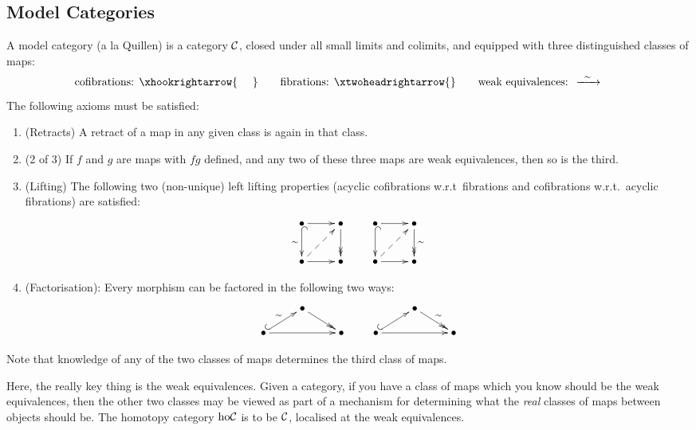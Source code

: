 \documentclass[11pt]{article}
\begin{document}
\subsection*{Model Categories}
A model category (a la Quillen) is a category $\mathcal{C}$, closed under all small limits and colimits, and equipped with three distinguished classes of maps:
\[\text{cofibrations: }\xhookrightarrow{\ \ \ \ }\qquad\text{fibrations: }\xtwoheadrightarrow{}\qquad\text{weak equivalences: }\xrightarrow{\ \,\sim\,\ }\qquad\]
The following axioms must be satisfied:
\begin{enumerate}\squishlist
\item (Retracts) A retract of a map in any given class is again in that class.
\item (2 of 3) If $f$ and $g$ are maps with $fg$ defined, and any two of these  three maps are weak equivalences, then so is the third.
\item (Lifting) The following two (non-unique) left lifting properties (acyclic cofibrations w.r.t\ fibrations and cofibrations w.r.t.\ acyclic fibrations) are satisfied:
\[\xymatrix{
\Bullet\ar[r]\ar@{^{(}->}[d]_\sim&\Bullet\ar@{->>}[d]\\
\Bullet\ar[r]\ar@{-->}[ur]&\Bullet
}\qquad
\xymatrix{
\Bullet\ar[r]\ar@{^{(}->}[d]&\Bullet\ar@{->>}[d]^\sim\\
\Bullet\ar[r]\ar@{-->}[ur]&\Bullet
}\]
\item (Factorisation): Every morphism can be factored in the following two ways:
\[\xymatrix@R=.4cm{
&\Bullet\ar@{->>}[dr]\\
\Bullet\ar@{^{(}->}[ur]^\sim\ar[rr]&&\Bullet
}\qquad
\xymatrix@R=.4cm{
&\Bullet\ar@{->>}[dr]^\sim\\
\Bullet\ar@{^{(}->}[ur]\ar[rr]&&\Bullet
}\]
\end{enumerate}
Note that knowledge of any of the two classes of maps determines the third class of maps.

Here, the really key thing is the weak equivalences. Given a category, if you have a class of maps which you know should be the weak equivalences, then the other two classes may be viewed as part of a mechanism for determining what the \emph{real} classes of maps between objects should be. The homotopy category $\textup{ho}\mathcal{C}$ is to be $\mathcal{C}$, localised at the weak equivalences.
\end{document}
